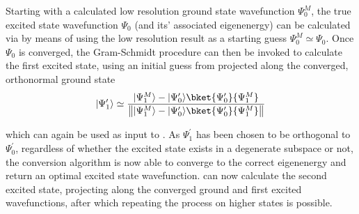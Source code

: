 Starting with a  calculated low resolution ground state wavefunction $\Psi_0^{M}$, the true excited state wavefunction $\Psi_0$ (and its' associated eigenenergy) can be calculated via  by means of using the low resolution result as a starting guess $\Psi_0^{M} \simeq \Psi_0$.
Once $\Psi_0$ is converged, the Gram-Schmidt procedure can then be invoked to calculate the first excited state, using an initial guess from  projected along the converged, orthonormal ground state
\begin{equation}
    \ket{\Psi^\prime_1} \simeq \frac{\ket{\Psi^M_1} - \ket{\Psi^\prime_0}\bket{\Psi^\prime_0}{\Psi^M_1}}{\norm[\big]{\ket{\Psi^M_1} - \ket{\Psi^\prime_0}\bket{\Psi^\prime_0}{\Psi^M_1}}}
\end{equation}

which can again be used as input to .
As $\Psi^\prime_1$ has been chosen to be orthogonal to $\Psi^\prime_0$, regardless of whether the excited state exists in a degenerate subspace or not, the conversion algorithm is now able to converge to the correct eigenenergy and return an optimal excited state wavefunction.
 can now calculate the second excited state, projecting along the converged ground and first excited wavefunctions, after which repeating the process  on higher states is possible.


